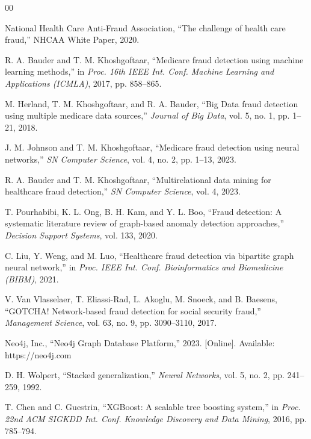 \documentclass[conference]{IEEEtran}
\begin{document}
\begin{thebibliography}{00}

National Health Care Anti-Fraud Association, ``The challenge of health care fraud,'' NHCAA White Paper, 2020.

R. A. Bauder and T. M. Khoshgoftaar, ``Medicare fraud detection using machine learning methods,'' in \textit{Proc. 16th IEEE Int. Conf. Machine Learning and Applications (ICMLA)}, 2017, pp. 858--865.

M. Herland, T. M. Khoshgoftaar, and R. A. Bauder, ``Big Data fraud detection using multiple medicare data sources,'' \textit{Journal of Big Data}, vol. 5, no. 1, pp. 1--21, 2018.

J. M. Johnson and T. M. Khoshgoftaar, ``Medicare fraud detection using neural networks,'' \textit{SN Computer Science}, vol. 4, no. 2, pp. 1--13, 2023.

R. A. Bauder and T. M. Khoshgoftaar, ``Multirelational data mining for healthcare fraud detection,'' \textit{SN Computer Science}, vol. 4, 2023.

T. Pourhabibi, K. L. Ong, B. H. Kam, and Y. L. Boo, ``Fraud detection: A systematic literature review of graph-based anomaly detection approaches,'' \textit{Decision Support Systems}, vol. 133, 2020.

C. Liu, Y. Weng, and M. Luo, ``Healthcare fraud detection via bipartite graph neural network,'' in \textit{Proc. IEEE Int. Conf. Bioinformatics and Biomedicine (BIBM)}, 2021.

V. Van Vlasselaer, T. Eliassi-Rad, L. Akoglu, M. Snoeck, and B. Baesens, ``GOTCHA! Network-based fraud detection for social security fraud,'' \textit{Management Science}, vol. 63, no. 9, pp. 3090--3110, 2017.

Neo4j, Inc., ``Neo4j Graph Database Platform,'' 2023. [Online]. Available: https://neo4j.com

D. H. Wolpert, ``Stacked generalization,'' \textit{Neural Networks}, vol. 5, no. 2, pp. 241--259, 1992.

T. Chen and C. Guestrin, ``XGBoost: A scalable tree boosting system,'' in \textit{Proc. 22nd ACM SIGKDD Int. Conf. Knowledge Discovery and Data Mining}, 2016, pp. 785--794.


\end{thebibliography}
\end{document}
